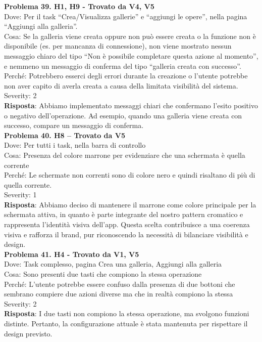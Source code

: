\documentclass{article}
\begin{document}
\noindent \textbf{Problema 39. H1, H9 - Trovato da V4, V5} \\
Dove: Per il task “Crea/Visualizza gallerie” e “aggiungi le opere”, nella pagina “Aggiungi alla galleria”. \\
Cosa: Se la galleria viene creata oppure non può essere creata o la funzione non è disponibile (es. per mancanza di connessione), non viene mostrato nessun messaggio chiaro del tipo “Non è possibile completare questa azione al momento”, e nemmeno un messaggio di conferma del tipo “galleria creata con successo”. \\
Perché: Potrebbero esserci degli errori durante la creazione o l’utente potrebbe non aver capito di averla creata a causa della limitata visibilità del sistema. \\
Severity: 2 \\
\textbf{Risposta}: Abbiamo implementato messaggi chiari che confermano l’esito positivo o negativo dell’operazione. Ad esempio, quando una galleria viene creata con successo, compare un messaggio di conferma. \\

\noindent \textbf{Problema 40. H8 – Trovato da V5} \\
Dove: Per tutti i task, nella barra di controllo \\
Cosa: Presenza del colore marrone per evidenziare che una schermata è quella corrente \\
Perché: Le schermate non correnti sono di colore nero e quindi risaltano di più di quella corrente. \\
Severity: 1 \\
\textbf{Risposta}: Abbiamo deciso di mantenere il marrone come colore principale per la schermata attiva, in quanto è parte integrante del nostro pattern cromatico e rappresenta l’identità visiva dell’app. Questa scelta contribuisce a una coerenza visiva e rafforza il brand, pur riconoscendo la necessità di bilanciare visibilità e design.\\

\noindent \textbf{Problema 41. H4 - Trovato da V1, V5} \\
Dove: Task complesso, pagina Crea una galleria, Aggiungi alla galleria \\
Cosa: Sono presenti due tasti che compiono la stessa operazione \\
Perché: L’utente potrebbe essere confuso dalla presenza di due bottoni che sembrano compiere due azioni diverse ma che in realtà compiono la stessa \\
Severity: 2 \\
\textbf{Risposta}: I due tasti non compiono la stessa operazione, ma svolgono funzioni distinte. Pertanto, la configurazione attuale è stata mantenuta per rispettare il design previsto.\\
\end{document}
